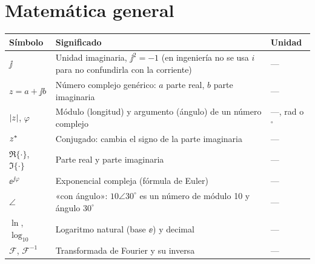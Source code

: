\section*{Matemática general}
\begin{longtable}{@{}>{\centering\arraybackslash}p{2.6cm}p{9.6cm}p{2.4cm}@{}}
\toprule \textbf{Símbolo} & \textbf{Significado} & \textbf{Unidad}\\ \midrule\endhead
$\jj$ & Unidad imaginaria, $\jj^2=-1$ (en ingeniería no se usa $i$ para no confundirla con la corriente) & --- \\
$z = a + \jj b$ & Número complejo genérico: $a$ parte real, $b$ parte imaginaria & --- \\
$\left|z\right|$, $\varphi$ & Módulo (longitud) y argumento (ángulo) de un número complejo & ---, rad o $^\circ$ \\
$z^{*}$ & Conjugado: cambia el signo de la parte imaginaria & --- \\
$\Re\{\cdot\}$, $\Im\{\cdot\}$ & Parte real y parte imaginaria & --- \\
$\ee^{\jj\varphi}$ & Exponencial compleja (fórmula de Euler) & --- \\
$\angle$ & «con ángulo»: $10\angle 30^\circ$ es un número de módulo 10 y ángulo $30^\circ$ & --- \\
$\ln$, $\log_{10}$ & Logaritmo natural (base $\ee$) y decimal & --- \\
$\mathcal{F}$, $\mathcal{F}^{-1}$ & Transformada de Fourier y su inversa & --- \\
\bottomrule
\end{longtable}


